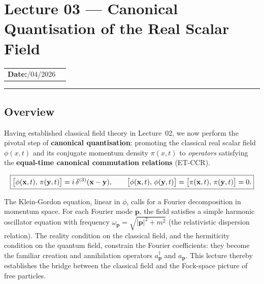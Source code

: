 
\section{Lecture 03 — Canonical Quantisation of the Real Scalar Field}\label{sec:lec03:quantisation}
\begin{center}
\begin{tabular}{ll}
  \textbf{Date:}\quad 12/04/2026   & \\
\end{tabular}
\end{center}
\hrule\vspace{1.5em}
\subsection*{Overview}

Having established classical field theory in Lecture~02, we now
perform the pivotal step of \textbf{canonical quantisation}: promoting
the classical real scalar field $\phi(x,t)$ and its conjugate momentum
density $\pi(x,t)$ to \emph{operators} satisfying the
\textbf{equal-time canonical commutation relations} (ET-CCR).

\begin{equation}
  \boxed{%
    \bigl[\phi(\mathbf{x},t),\,\pi(\mathbf{y},t)\bigr]
    = i\,\delta^{(3)}(\mathbf{x}-\mathbf{y}),
    \qquad
    \bigl[\phi(\mathbf{x},t),\,\phi(\mathbf{y},t)\bigr]
    = \bigl[\pi(\mathbf{x},t),\,\pi(\mathbf{y},t)\bigr]=0.
  }
  \label{eq:lec03:ETCCR}
\end{equation}

The Klein-Gordon equation, linear in $\phi$, calls for a
Fourier decomposition in momentum space.  For each Fourier mode
$\mathbf{p}$, the field satisfies a simple harmonic oscillator equation
with frequency $\omega_{\mathbf{p}}=\sqrt{|\mathbf{p}|^2+m^2}$
(the relativistic dispersion relation).  The reality condition on the
classical field, and the hermiticity condition on the quantum field,
constrain the Fourier coefficients: they become the familiar creation
and annihilation operators $a_{\mathbf{p}}^\dagger$ and
$a_{\mathbf{p}}$.  This lecture thereby establishes the bridge between
the classical field and the Fock-space picture of free particles.

